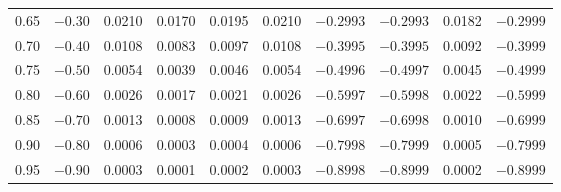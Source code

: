 \documentclass[11pt,reqno]{amsart}
\theoremstyle{plain}
\theoremstyle{definition}
\theoremstyle{remark}
\numberwithin{equation}{section}
\begin{document}
\begin{table}[p]
\begin{tabular}{@{}crrrrrrrrr@{}}
0.65 & $-0.30$ & 0.0210 & 0.0170 & 0.0195 & 0.0210 & $-0.2993$ & $-0.2993$ & 0.0182 & $-0.2999$ \\
0.70 & $-0.40$ & 0.0108 & 0.0083 & 0.0097 & 0.0108 & $-0.3995$ & $-0.3995$ & 0.0092 & $-0.3999$ \\
0.75 & $-0.50$ & 0.0054 & 0.0039 & 0.0046 & 0.0054 & $-0.4996$ & $-0.4997$ & 0.0045 & $-0.4999$ \\
0.80 & $-0.60$ & 0.0026 & 0.0017 & 0.0021 & 0.0026 & $-0.5997$ & $-0.5998$ & 0.0022 & $-0.5999$ \\
0.85 & $-0.70$ & 0.0013 & 0.0008 & 0.0009 & 0.0013 & $-0.6997$ & $-0.6998$ & 0.0010 & $-0.6999$ \\
0.90 & $-0.80$ & 0.0006 & 0.0003 & 0.0004 & 0.0006 & $-0.7998$ & $-0.7999$ & 0.0005 & $-0.7999$ \\
0.95 & $-0.90$ & 0.0003 & 0.0001 & 0.0002 & 0.0003 & $-0.8998$ & $-0.8999$ & 0.0002 & $-0.8999$ \\
\bottomrule
\end{tabular}
\end{table}
\end{document}

